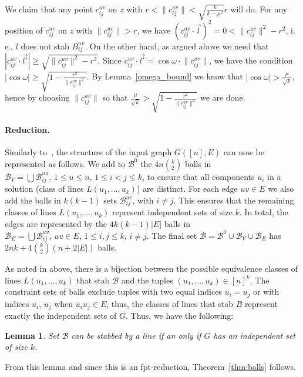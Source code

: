 \documentclass[12pt]{article}
\newtheorem{lemma}[definition]{Lemma}
\begin{document}
We claim that any point $c_{ij}^{uv}$ on $z$ with $r<\lVert c_{ij}^{uv}\rVert<\sqrt{\frac{k}{k-\mu^2}}r$ will do.
For any position of $c_{ij}^{uv}$ on $z$ with $\lVert c_{ij}^{uv}\rVert>r$, we have 
$(c_{ij}^{uv}\cdot \vec{l})^2=0<\lVert c_{ij}^{uv}\rVert^2-r^2$, 
i.\,e., $l$ does not stab $B_{ij}^{uv}$. 
On the other hand, as argued above we need that $|c_{ij}^{uv}\cdot \vec{l'}|\geq \sqrt{\lVert c_{ij}^{uv}\rVert^2-r^2}$.
Since $c_{ij}^{uv}\cdot \vec{l'}=\cos\omega\cdot \lVert c_{ij}^{uv}\rVert$, 
we have the condition $|\cos\omega|\geq\sqrt{1-\frac{r^2}{\lVert c_{ij}^{uv}\rVert^2}}$. By Lemma~\ref{omega_bound} we know that 
$|\cos\omega|>\frac{\mu}{\sqrt{k}}$, hence by choosing $\lVert c_{ij}^{uv}\rVert$ 
so that $\frac{\mu}{\sqrt{k}}>\sqrt{1-\frac{r^2}{\lVert c_{ij}^{uv}\rVert^2}}$ 
we are done.
\paragraph{Reduction.}
Similarly to~\cite{CGKR08}, the structure of the input graph $G([n], E)$ can now be represented as follows.
We add to $\mathcal{B}^0$ the $4n\binom k 2$ balls in 
$\mathcal{B}_V=\bigcup \mathcal{B}_{ij}^{uu},\, 1\leq u\leq n, \, 1\leq i<j\leq k$, to ensure that 
all components $u_i$ in a solution (class of lines $L(u_1,\ldots,u_k)$) are distinct. 
For each edge $uv\in E$ we also add the balls in $k(k-1)$ sets $\mathcal{B}_{ij}^{uv}$, with $i\neq j$.
This ensures that the remaining classes of lines $L(u_1,\ldots,u_k)$ represent independent sets of size $k$.
In total, the edges are represented by the $4k(k-1)|E|$ balls in 
$\mathcal{B}_E=\bigcup \mathcal{B}_{ij}^{uv},\, uv\in E,\, 1\leq i,j\leq k,\, i\neq j$.
The final set $\mathcal{B}=\mathcal{B}^0\cup\mathcal{B}_V\cup\mathcal{B}_E$ has $2nk+4\binom k 2 (n+2|E|)$ balls.

As noted in above, there is a bijection between the possible equivalence classes of lines $L(u_1,\ldots,u_k)$ that 
stab $\mathcal{B}$ and the tuples $(u_1,\ldots,u_k)\in [n]^k$. The constraint sets of balls exclude tuples with two equal indices 
$u_i=u_j$ or with indices $u_i$, $u_j$ when $u_iu_j\in E$, thus, the classes of lines that stab $B$ represent exactly the independent 
sets of $G$. Thus, we have the following:
\begin{lemma}
Set $\mathcal{B}$ can be stabbed by a line if an only if $G$ has an independent set of size $k$.
\end{lemma}
From this lemma and since this is an fpt-reduction, Theorem~\ref{thm:balls} follows.
 




\end{document}
